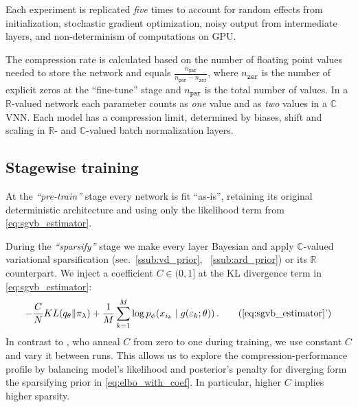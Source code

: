 \documentclass[a4paper,10pt,twocolumn]{article}
\newcommand{\real}{\mathbb{R}}
\newcommand{\cplx}{\mathbb{C}}
\begin{document}
Each experiment is replicated \emph{five} times to account for random effects from
initialization, stochastic gradient optimization, noisy output from intermediate layers,
and non-determinism of computations on GPU.

The compression rate is calculated based on the number of floating point values needed
to store the network and equals $
  \tfrac{n_\mathtt{par}}{n_\mathtt{par} - n_\mathtt{zer}}
$, where $n_\mathtt{zer}$ is the number of explicit zeros at the ``fine-tune'' stage
and $n_\mathtt{par}$ is the total number of values. In a $\real$-valued network each
parameter counts as \emph{one} value and as \emph{two} values in a $\cplx$VNN. Each
model has a compression limit, determined by biases, shift and scaling in $\real$-
and $\cplx$-valued batch normalization layers.

\subsection{Stagewise training} %
\label{sub:staging}

At the \emph{``pre-train''} stage every network is fit ``as-is'', retaining its original
deterministic architecture and using only the likelihood term from \eqref{eq:sgvb_estimator}.

During the \emph{``sparsify''} stage we make every layer Bayesian and apply $\cplx$-valued
variational sparsification (sec.~\ref{ssub:vd_prior}, ~\ref{ssub:ard_prior}) or its $\real$
counterpart. We inject a coefficient $
  C \in (0, 1]
$ at the KL divergence term in \eqref{eq:sgvb_estimator}:
\begin{equation}  \label{eq:elbo_with_coef}
  - \frac{C}N KL(q_{\theta} \| \pi_{\lambda})
  + \frac1{M} \sum_{k=1}^M
      \log p_{\phi}(x_{i_k} \mid g(\varepsilon_k; \theta))
  \,.
  \tag{\ref{eq:sgvb_estimator}'}
\end{equation}
In contrast to \cite{molchanov_variational_2017}, who anneal $C$ from zero to one during
training, we use constant $C$ and vary it between runs. This allows us to explore the
compression-performance profile by balancing model's likelihood and posterior's penalty
for diverging form the sparsifying prior in \eqref{eq:elbo_with_coef}. In particular,
higher $C$ implies higher sparsity.
\end{document}
